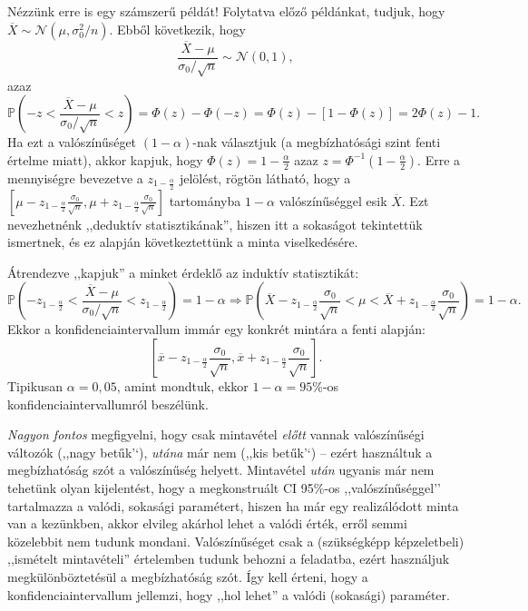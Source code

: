\documentclass[
]{book}
\begin{document}
Nézzünk erre is egy számszerű példát! Folytatva előző példánkat, tudjuk, hogy \(\overline{X} \sim \mathcal{N}\left(\mu,\sigma_0^2/n\right)\). Ebből következik, hogy
\[
    \frac{\overline{X}-\mu}{\sigma_0/\sqrt{n}}\sim\mathcal{N}\left(0,1\right),
\]
azaz
\[
    \mathbb{P}\left(-z<\frac{\overline{X}-\mu}{\sigma_0/\sqrt{n}}<z\right)=\Phi\left(z\right)-\Phi\left(-z\right)=\Phi\left(z\right)-\left[1-\Phi\left(z\right)\right]=2\Phi\left(z\right)-1.
\]
Ha ezt a valószínűséget \(\left(1-\alpha\right)\)-nak választjuk (a megbízhatósági szint fenti értelme miatt), akkor kapjuk, hogy \(\Phi\left(z\right)=1-\frac{\alpha}{2}\) azaz \(z=\Phi^{-1}\left(1-\frac{\alpha}{2}\right)\). Erre a mennyiségre bevezetve a \(z_{1-\frac{\alpha}{2}}\) jelölést, rögtön látható, hogy a \(\left[\mu-z_{1-\frac{\alpha}{2}}\frac{\sigma_0}{\sqrt{n}},\mu+z_{1-\frac{\alpha}{2}}\frac{\sigma_0}{\sqrt{n}}\right]\) tartományba \(1-\alpha\) valószínűséggel esik \(\overline{X}\). Ezt nevezhetnénk ,,deduktív statisztikának'', hiszen itt a sokaságot tekintettük ismertnek, és ez alapján következtettünk a minta viselkedésére.

Átrendezve ,,kapjuk'' a minket érdeklő az induktív statisztikát:
\[
    \mathbb{P}\left(-z_{1-\frac{\alpha}{2}}<\frac{\overline{X}-\mu}{\sigma_0/\sqrt{n}}<z_{1-\frac{\alpha}{2}}\right)=1-\alpha \Rightarrow \mathbb{P}\left(\overline{X}-z_{1-\frac{\alpha}{2}}\frac{\sigma_0}{\sqrt{n}}<\mu<\overline{X}+z_{1-\frac{\alpha}{2}}\frac{\sigma_0}{\sqrt{n}}\right)=1-\alpha.
\]
Ekkor a konfidenciaintervallum immár egy konkrét mintára a fenti alapján:
\[
    \left[\overline{x}-z_{1-\frac{\alpha}{2}}\frac{\sigma_0}{\sqrt{n}},\overline{x}+z_{1-\frac{\alpha}{2}}\frac{\sigma_0}{\sqrt{n}}\right].
\]
Tipikusan \(\alpha=0,\!05\), amint mondtuk, ekkor \(1-\alpha=95\)\%-os konfidenciaintervallumról beszélünk.

\emph{Nagyon fontos} megfigyelni, hogy csak mintavétel \emph{előtt} vannak valószínűségi változók (,,nagy betűk'`), \emph{utána} már nem (,,kis betűk'`) -- ezért használtuk a megbízhatóság szót a valószínűség helyett. Mintavétel \emph{után} ugyanis már nem tehetünk olyan kijelentést, hogy a megkonstruált CI 95\%-os ,,valószínűséggel'' tartalmazza a valódi, sokasági paramétert, hiszen ha már egy realizálódott minta van a kezünkben, akkor elvileg akárhol lehet a valódi érték, erről semmi közelebbit nem tudunk mondani. Valószínűséget csak a (szükségképp képzeletbeli) ,,ismételt mintavételi'' értelemben tudunk behozni a feladatba, ezért használjuk megkülönböztetésül a megbízhatóság szót. Így kell érteni, hogy a konfidenciaintervallum jellemzi, hogy ,,hol lehet'' a valódi (sokasági) paraméter.
\end{document}
